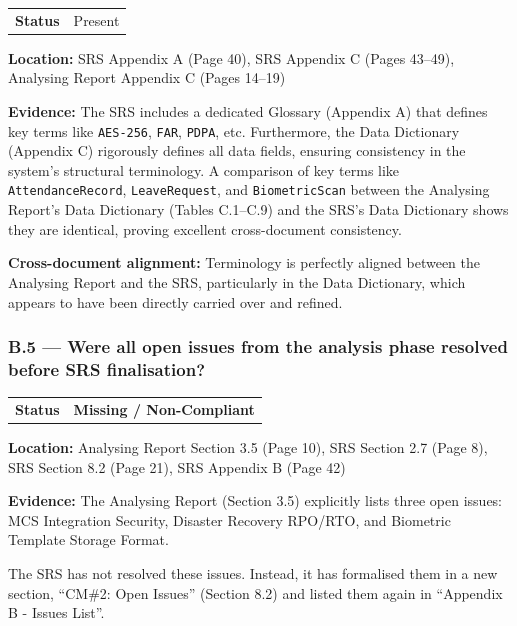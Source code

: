 \documentclass[11pt,a4paper]{article}
\begin{document}
\begin{tabular}{p{}p{}}
\textbf{Status} & Present \\
\end{tabular}

\textbf{Location:} SRS Appendix A (Page 40), SRS Appendix C (Pages 43--49), Analysing Report Appendix C (Pages 14--19)

\textbf{Evidence:} The SRS includes a dedicated Glossary (Appendix A) that defines key terms like \texttt{AES-256}, \texttt{FAR}, \texttt{PDPA}, etc. Furthermore, the Data Dictionary (Appendix C) rigorously defines all data fields, ensuring consistency in the system's structural terminology. A comparison of key terms like \texttt{AttendanceRecord}, \texttt{LeaveRequest}, and \texttt{BiometricScan} between the Analysing Report's Data Dictionary (Tables C.1--C.9) and the SRS's Data Dictionary shows they are identical, proving excellent cross-document consistency.

\textbf{Cross-document alignment:} Terminology is perfectly aligned between the Analysing Report and the SRS, particularly in the Data Dictionary, which appears to have been directly carried over and refined.

\vspace{0.8em}

\subsubsection*{B.5 --- Were all open issues from the analysis phase resolved before SRS finalisation?}

\begin{tabular}{p{}p{}}
\textbf{Status} & \cellcolor{critical}\textbf{Missing / Non-Compliant} \\
\end{tabular}

\textbf{Location:} Analysing Report Section 3.5 (Page 10), SRS Section 2.7 (Page 8), SRS Section 8.2 (Page 21), SRS Appendix B (Page 42)

\textbf{Evidence:} The Analysing Report (Section 3.5) explicitly lists three open issues: MCS Integration Security, Disaster Recovery RPO/RTO, and Biometric Template Storage Format.

The SRS has not resolved these issues. Instead, it has formalised them in a new section, ``CM\#2: Open Issues'' (Section 8.2) and listed them again in ``Appendix B - Issues List''.
\end{document}
